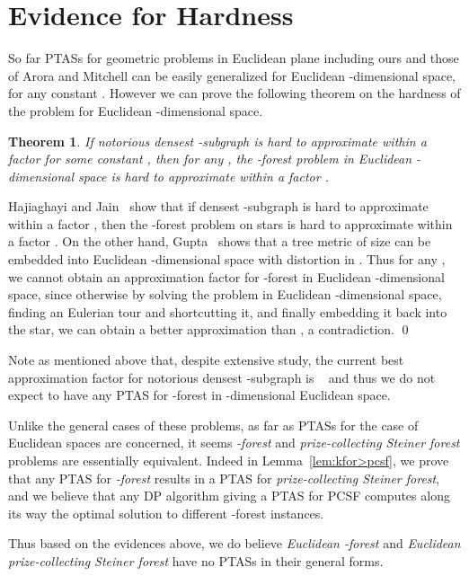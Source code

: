 \documentclass[extras,11pt]{article} \usepackage{fullpage}
\theoremstyle{mytheorem}
\newtheorem{theorem}{Theorem}
\renewenvironment{proof}{\par\noindent{\bf Proof.}\hspace{0.5em}}
    {\hfill\qed\vspace{1ex}}
\newcommand{\prob}[1]{\textit{#1}}
\begin{document}
\section{Evidence for Hardness}\label{sec:challenge}

So far PTASs for geometric problems in Euclidean plane including
ours and those of Arora \cite{arora98:ptas} and Mitchell
\cite{cr:26} can be easily generalized for Euclidean -dimensional
space, for any constant . However we can prove the following
theorem on the hardness of the problem for Euclidean -dimensional
space.

\begin{theorem}
If notorious densest -subgraph is hard to approximate within a
factor  for some constant , then for any , the -forest problem in Euclidean -dimensional space is
hard to approximate within a factor
.
\end{theorem}
\begin{proof}
Hajiaghayi and Jain~\cite{HJ06} show that if densest -subgraph is
hard to approximate within a factor , then the
-forest problem on stars is hard to approximate within a factor
. On the other hand, Gupta~\cite{Gupta00} shows
that a tree metric of size  can be embedded into Euclidean
-dimensional space with distortion in .
Thus for any , we cannot obtain an approximation factor
 for -forest in Euclidean
-dimensional space, since otherwise by solving the problem in
Euclidean -dimensional space, finding an Eulerian tour and
shortcutting it, and finally embedding it back into the star, we can
obtain a better approximation than , a
contradiction.
\end{proof}


Note as mentioned above that, despite extensive study, 
the current best approximation factor 
for notorious densest -subgraph is
~\cite{FKP01} and thus we do not expect
to have any PTAS for -forest in -dimensional Euclidean space.



Unlike the general cases of these problems,
 as far as PTASs for the case of Euclidean spaces are concerned,
 it seems \prob{-forest} and \prob{prize-collecting Steiner forest} problems are essentially equivalent.
 Indeed in Lemma~\ref{lem:kfor>pcsf}, we prove that any PTAS for \prob{-forest} results in a PTAS for \prob{prize-collecting Steiner
 forest},
 and we believe that any DP algorithm giving a PTAS for PCSF computes
 along its way the optimal solution to different -forest instances.


Thus based on the evidences above, we do believe \prob{Euclidean
-forest} and \prob{Euclidean prize-collecting Steiner forest}
have no PTASs in their general forms.
\end{document}

